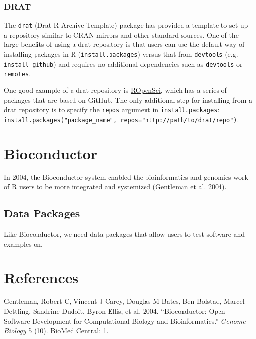 \documentclass[]{elsarticle} %
\begin{document}
\subsubsection{DRAT}\label{drat}

The \texttt{drat} (Drat R Archive Template) package has provided a
template to set up a repository similar to CRAN mirrors and other
standard sources. One of the large benefits of using a drat repository
is that users can use the default way of installing packages in R
(\texttt{install.packages}) versus that from \texttt{devtools} (e.g.
\texttt{install\_github}) and requires no additional dependencies such
as \texttt{devtools} or \texttt{remotes}.

One good example of a drat repository is
\href{https://ropensci.org/}{ROpenSci}, which has a series of packages
that are based on GitHub. The only additional step for installing from a
drat repository is to specify the \texttt{repos} argument in
\texttt{install.packages}:
\texttt{install.packages("package\_name",\ repos="http://path/to/drat/repo")}.

\section{Bioconductor}\label{bioconductor}

In 2004, the Bioconductor system enabled the bioinformatics and genomics
work of R users to be more integrated and systemized (Gentleman et al.
2004).

\subsection{Data Packages}\label{data-packages}

Like Bioconductor, we need data packages that allow users to test
software and examples on.

\section*{References}\label{references}

\hypertarget{refs}{}
\hypertarget{ref-gentleman2004bioconductor}{}
Gentleman, Robert C, Vincent J Carey, Douglas M Bates, Ben Bolstad,
Marcel Dettling, Sandrine Dudoit, Byron Ellis, et al. 2004.
``Bioconductor: Open Software Development for Computational Biology and
Bioinformatics.'' \emph{Genome Biology} 5 (10). BioMed Central: 1.
\end{document}
